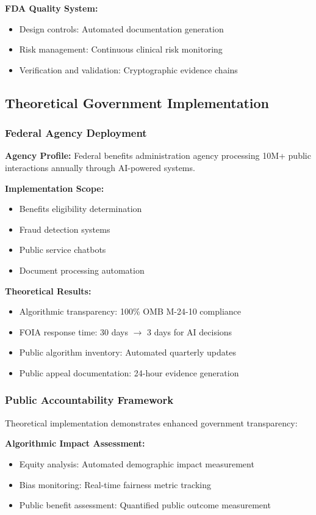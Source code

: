 \documentclass[12pt,a4paper]{article}
\begin{document}
\textbf{FDA Quality System:}
\begin{itemize}
\item Design controls: Automated documentation generation
\item Risk management: Continuous clinical risk monitoring
\item Verification and validation: Cryptographic evidence chains
\end{itemize}

\subsection{Theoretical Government Implementation}

\subsubsection{Federal Agency Deployment}

\textbf{Agency Profile:} Federal benefits administration agency processing 10M+ public interactions annually through AI-powered systems.

\textbf{Implementation Scope:}
\begin{itemize}
\item Benefits eligibility determination
\item Fraud detection systems
\item Public service chatbots
\item Document processing automation
\end{itemize}

\textbf{Theoretical Results:}
\begin{itemize}
\item Algorithmic transparency: 100\% OMB M-24-10 compliance
\item FOIA response time: 30 days $\rightarrow$ 3 days for AI decisions
\item Public algorithm inventory: Automated quarterly updates
\item Public appeal documentation: 24-hour evidence generation
\end{itemize}

\subsubsection{Public Accountability Framework}

Theoretical implementation demonstrates enhanced government transparency:

\textbf{Algorithmic Impact Assessment:}
\begin{itemize}
\item Equity analysis: Automated demographic impact measurement
\item Bias monitoring: Real-time fairness metric tracking
\item Public benefit assessment: Quantified public outcome measurement
\end{itemize}
\end{document}
